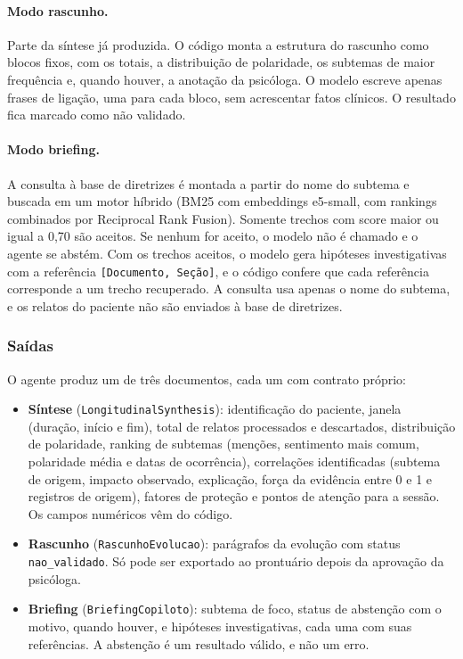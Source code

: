 \documentclass[12pt,a4paper]{article}
\begin{document}
\paragraph{Modo rascunho.} Parte da síntese já produzida. O código monta a estrutura do rascunho como blocos fixos, com os totais, a distribuição de polaridade, os subtemas de maior frequência e, quando houver, a anotação da psicóloga. O modelo escreve apenas frases de ligação, uma para cada bloco, sem acrescentar fatos clínicos. O resultado fica marcado como não validado.

\paragraph{Modo briefing.} A consulta à base de diretrizes é montada a partir do nome do subtema e buscada em um motor híbrido (BM25 com embeddings e5-small, com rankings combinados por Reciprocal Rank Fusion). Somente trechos com score maior ou igual a 0,70 são aceitos. Se nenhum for aceito, o modelo não é chamado e o agente se abstém. Com os trechos aceitos, o modelo gera hipóteses investigativas com a referência \texttt{[Documento, Seção]}, e o código confere que cada referência corresponde a um trecho recuperado. A consulta usa apenas o nome do subtema, e os relatos do paciente não são enviados à base de diretrizes.

\subsubsection{Saídas}
O agente produz um de três documentos, cada um com contrato próprio:
\begin{itemize}
  \item \textbf{Síntese} (\texttt{LongitudinalSynthesis}): identificação do paciente, janela (duração, início e fim), total de relatos processados e descartados, distribuição de polaridade, ranking de subtemas (menções, sentimento mais comum, polaridade média e datas de ocorrência), correlações identificadas (subtema de origem, impacto observado, explicação, força da evidência entre 0 e 1 e registros de origem), fatores de proteção e pontos de atenção para a sessão. Os campos numéricos vêm do código.
  \item \textbf{Rascunho} (\texttt{RascunhoEvolucao}): parágrafos da evolução com status \texttt{nao\_validado}. Só pode ser exportado ao prontuário depois da aprovação da psicóloga.
  \item \textbf{Briefing} (\texttt{BriefingCopiloto}): subtema de foco, status de abstenção com o motivo, quando houver, e hipóteses investigativas, cada uma com suas referências. A abstenção é um resultado válido, e não um erro.
\end{itemize}
\end{document}
